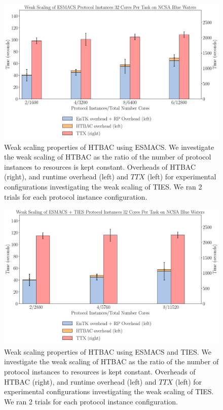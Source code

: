 \begin{figure}
  \centering
    \includegraphics[width=\columnwidth]{figures/new_ws_esmacs.pdf}
    \caption{Weak scaling properties of HTBAC using ESMACS. We investigate
    the weak scaling of HTBAC as the ratio of the number of protocol
    instances to resources is kept constant. Overheads of HTBAC (right), and
    runtime overhead (left) and \(TTX\) (left) for experimental
    configurations investigating the weak scaling of TIES. We ran 2 trials
    for each protocol instance configuration.}
\label{fig:weak_scaling_ESMACS}
\end{figure}

\begin{figure}
  \centering
    \includegraphics[width=\columnwidth]{figures/new_ws_esmacs_ties.pdf}
    \caption{Weak scaling properties of HTBAC using ESMACS and TIES. We
    investigate the weak scaling of HTBAC as the ratio of the number of
    protocol instances to resources is kept constant. Overheads of HTBAC
    (right), and runtime overhead (left) and \(TTX\) (left) for experimental
    configurations investigating the weak scaling of TIES. We ran 2 trials
    for each protocol instance configuration.}
\label{fig:weak_scaling_ESMACS_TIES}
\end{figure}

